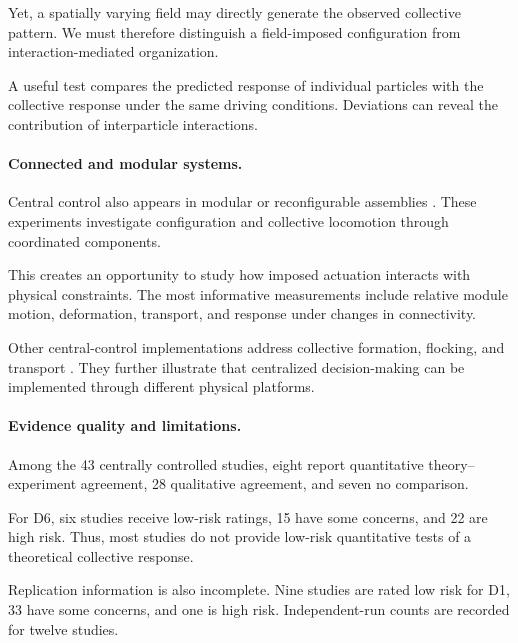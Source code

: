 Yet, a spatially varying field
may directly generate the
observed collective pattern.
We must therefore distinguish
a field-imposed configuration
from interaction-mediated
organization.

A useful test compares
the predicted response
of individual particles
with the collective
response under the
same driving conditions.
Deviations can reveal
the contribution of
interparticle interactions.

\paragraph*{Connected and modular systems.}

Central control also appears
in modular or reconfigurable
assemblies
\cite{Yi2025reconfigurablerobot,Zhao2024snailinspiredrobot,Bhattacharjee2026collectiveassembly,Kaeser2025individualandcolle,Ding2025transformablemodula,Zhao2022softlatticemodules,Paulos2015automatedselfassem}.
These experiments investigate
configuration and collective
locomotion through coordinated
components.

This creates an opportunity
to study how imposed
actuation interacts
with physical constraints.
The most informative
measurements include
relative module motion,
deformation, transport,
and response under
changes in connectivity.

Other central-control
implementations address
collective formation,
flocking, and transport
\cite{PitaRomero2026flockingbehaviorfo,Jia2014experimentalimpleme,Fu2023tabletopplatformo,Delight2016developingrobotics,Su2026safetycriticalmult,MendozaRobles2026distributedformatio}.
They further illustrate
that centralized decision-making
can be implemented through
different physical platforms.

\paragraph*{Evidence quality and limitations.}

Among the 43 centrally controlled
studies, eight report quantitative
theory--experiment agreement,
28 qualitative agreement,
and seven no comparison.

For D6, six studies receive
low-risk ratings, 15 have
some concerns, and 22
are high risk.
Thus, most studies
do not provide
low-risk quantitative
tests of a theoretical
collective response.

Replication information is
also incomplete.
Nine studies are rated
low risk for D1,
33 have some concerns,
and one is high risk.
Independent-run counts
are recorded for twelve
studies.

